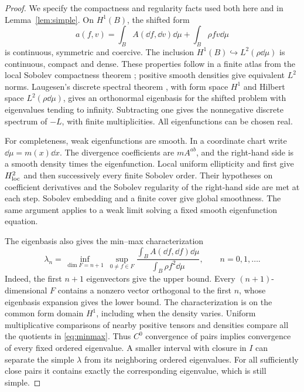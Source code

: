 \begin{proof}
We specify the compactness and regularity facts used both here
and in Lemma~\ref{lem:simple}.
On \(H^1(B)\), the shifted form
\[
 a(f,v)=\int_B A(\dd f,\dd v)\dd\mu+
                     \int_B\rho fv\dd\mu
\]
is continuous, symmetric and coercive.
The inclusion \(H^1(B)\hookrightarrow L^2(\rho\dd\mu)\)
is continuous, compact and dense.
These properties follow in a finite atlas from the local Sobolev
compactness theorem \cite[Theorem~3.49, p.~76]{Hunter};
positive smooth densities give equivalent \(L^2\) norms.
Laugesen's discrete spectral theorem
\cite[Theorem~4.1, pp.~28--32]{Laugesen}, with form space
\(H^1\) and Hilbert space \(L^2(\rho\dd\mu)\), gives an orthonormal
eigenbasis for the shifted problem with eigenvalues tending to
infinity. Subtracting one gives the nonnegative discrete spectrum
of \(-L\), with finite multiplicities.
All eigenfunctions can be chosen real.

For completeness, weak eigenfunctions are smooth.
In a coordinate chart write \(\dd\mu=m(x)\dd x\).
The divergence coefficients are \(mA^{ab}\), and the right-hand
side is a smooth density times the eigenfunction.
Local uniform ellipticity and
\cite[Theorems~4.27--4.28, pp.~112--114]{Hunter}
first give \(H^2_{\rm loc}\) and then successively every finite
Sobolev order. Their hypotheses on coefficient derivatives and
the Sobolev regularity of the right-hand side are met at each
step. Sobolev embedding and a finite cover give global smoothness.
The same argument applies to a weak limit solving a fixed smooth
eigenfunction equation.

The eigenbasis also gives the min--max characterization
\begin{equation}\label{eq:minmax}
 \lambda_n=\inf_{\dim F=n+1}\ \sup_{0\ne f\in F}
 \frac{\int_B A(\dd f,\dd f)\dd\mu}
      {\int_B\rho f^2\dd\mu},\qquad n=0,1,\ldots .
\end{equation}
Indeed, the first \(n+1\) eigenvectors give the upper bound.
Every \((n+1)\)-dimensional \(F\) contains a nonzero vector
orthogonal to the first \(n\), whose eigenbasis expansion gives
the lower bound. The characterization is on the common form
domain \(H^1\), including when the density varies.
Uniform multiplicative comparisons of nearby positive tensors
and densities compare all the quotients in \eqref{eq:minmax}.
Thus \(C^0\) convergence of pairs implies convergence of every
fixed ordered eigenvalue. A smaller interval with closure in \(I\)
can separate the simple \(\lambda\) from its neighboring
ordered eigenvalues. For all sufficiently close pairs it contains
exactly the corresponding eigenvalue, which is still simple.


\end{proof}
